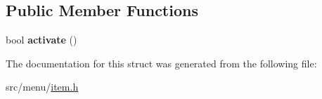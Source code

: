 \subsection*{Public Member Functions}
\begin{DoxyCompactItemize}
\item 
\mbox{\label{structAction_aa6fc5f4e218f7a3a7d254624ed206ecf}} 
bool {\bfseries activate} ()
\end{DoxyCompactItemize}


The documentation for this struct was generated from the following file\+:\begin{DoxyCompactItemize}
\item 
src/menu/\hyperlink{item_8h}{item.\+h}\end{DoxyCompactItemize}
